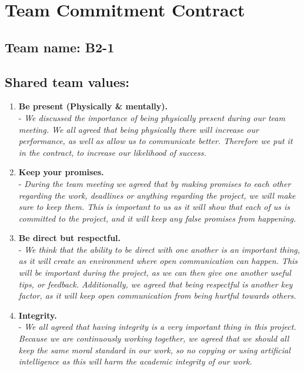 \chapter{Team Commitment Contract}
\label{tab:TCC}
\section*{\textcolor{Delft_Blue}{\textbf{Team name: B2-1\vspace{5pt}}}}
\section*{\textcolor{Delft_Blue}{\textbf{Shared team values:\vspace{5pt}}}}

\begin{enumerate}
    \item \textbf{Be present (Physically \& mentally).}\\
- \textit{We discussed the importance of being physically present during our team meeting. We all agreed that being physically there will increase our performance, as well as allow us to communicate better. Therefore we put it in the contract, to increase our likelihood of success.} \\
    \item \textbf{Keep your promises.}\\
- \textit{During the team meeting we agreed that by making promises to each other regarding the work, deadlines or anything regarding the project, we will make sure to keep them. This is important to us as it will show that each of us is committed to the project, and it will keep any false promises from happening.}\\
    \item \textbf{Be direct but respectful.}\\
- \textit{We think that the ability to be direct with one another is an important thing, as it will create an environment where open communication can happen. This will be important during the project, as we can then give one another useful tips, or feedback. Additionally, we agreed that being respectful is another key factor, as it will keep open communication from being hurtful towards others.}\\
    \item \textbf{Integrity.}\\
- \textit{We all agreed that having integrity is a very important thing in this project. Because we are continuously working together, we agreed that we should all keep the same moral standard in our work, so no copying or using artificial intelligence as this will harm the academic integrity of our work.}\\
\end{enumerate}


